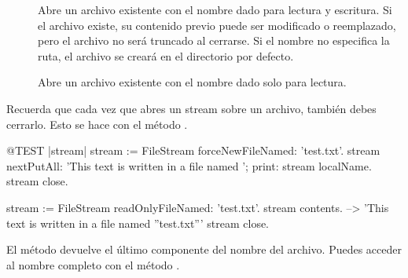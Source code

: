 \documentclass[a4paper,10pt,twoside]{book}
\begin{document}
{\begin{description}
\item[] Abre un archivo existente con el nombre dado para 
    lectura y escritura. Si el archivo existe, su contenido previo puede ser
    modificado o reemplazado, pero el archivo no ser\'a truncado al cerrarse.
    Si el nombre no especifica la ruta, el archivo se crear\'a en el directorio por defecto.

\item[] Abre un archivo existente con el nombre dado solo para lectura.

\end{description}

Recuerda que cada vez que abres un stream sobre un archivo, tambi\'en debes cerrarlo. 
Esto se hace con el m\'etodo .

\begin{code}{@TEST |stream|}
stream := FileStream forceNewFileNamed: 'test.txt'.
stream
    nextPutAll: 'This text is written in a file named ';
    print: stream localName.
stream close.

stream := FileStream readOnlyFileNamed: 'test.txt'.
stream contents. --> 'This text is written in a file named ''test.txt'''
stream close.
\end{code}



El m\'etodo  devuelve el \'ultimo componente del nombre del archivo. 
Puedes acceder al nombre completo con el m\'etodo .
 
}
\end{document}
